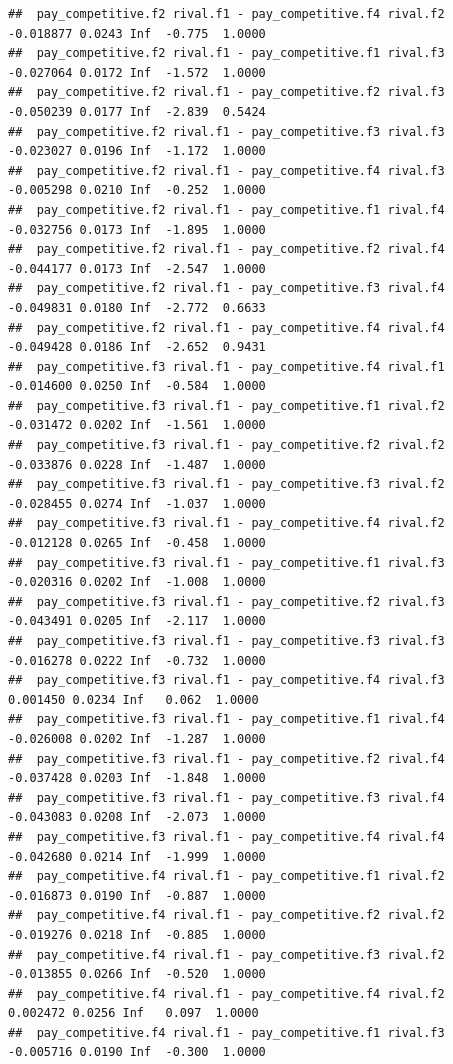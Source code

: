 \documentclass[
]{article}
\begin{document}
\begin{verbatim}
##  pay_competitive.f2 rival.f1 - pay_competitive.f4 rival.f2 -0.018877 0.0243 Inf  -0.775  1.0000
##  pay_competitive.f2 rival.f1 - pay_competitive.f1 rival.f3 -0.027064 0.0172 Inf  -1.572  1.0000
##  pay_competitive.f2 rival.f1 - pay_competitive.f2 rival.f3 -0.050239 0.0177 Inf  -2.839  0.5424
##  pay_competitive.f2 rival.f1 - pay_competitive.f3 rival.f3 -0.023027 0.0196 Inf  -1.172  1.0000
##  pay_competitive.f2 rival.f1 - pay_competitive.f4 rival.f3 -0.005298 0.0210 Inf  -0.252  1.0000
##  pay_competitive.f2 rival.f1 - pay_competitive.f1 rival.f4 -0.032756 0.0173 Inf  -1.895  1.0000
##  pay_competitive.f2 rival.f1 - pay_competitive.f2 rival.f4 -0.044177 0.0173 Inf  -2.547  1.0000
##  pay_competitive.f2 rival.f1 - pay_competitive.f3 rival.f4 -0.049831 0.0180 Inf  -2.772  0.6633
##  pay_competitive.f2 rival.f1 - pay_competitive.f4 rival.f4 -0.049428 0.0186 Inf  -2.652  0.9431
##  pay_competitive.f3 rival.f1 - pay_competitive.f4 rival.f1 -0.014600 0.0250 Inf  -0.584  1.0000
##  pay_competitive.f3 rival.f1 - pay_competitive.f1 rival.f2 -0.031472 0.0202 Inf  -1.561  1.0000
##  pay_competitive.f3 rival.f1 - pay_competitive.f2 rival.f2 -0.033876 0.0228 Inf  -1.487  1.0000
##  pay_competitive.f3 rival.f1 - pay_competitive.f3 rival.f2 -0.028455 0.0274 Inf  -1.037  1.0000
##  pay_competitive.f3 rival.f1 - pay_competitive.f4 rival.f2 -0.012128 0.0265 Inf  -0.458  1.0000
##  pay_competitive.f3 rival.f1 - pay_competitive.f1 rival.f3 -0.020316 0.0202 Inf  -1.008  1.0000
##  pay_competitive.f3 rival.f1 - pay_competitive.f2 rival.f3 -0.043491 0.0205 Inf  -2.117  1.0000
##  pay_competitive.f3 rival.f1 - pay_competitive.f3 rival.f3 -0.016278 0.0222 Inf  -0.732  1.0000
##  pay_competitive.f3 rival.f1 - pay_competitive.f4 rival.f3  0.001450 0.0234 Inf   0.062  1.0000
##  pay_competitive.f3 rival.f1 - pay_competitive.f1 rival.f4 -0.026008 0.0202 Inf  -1.287  1.0000
##  pay_competitive.f3 rival.f1 - pay_competitive.f2 rival.f4 -0.037428 0.0203 Inf  -1.848  1.0000
##  pay_competitive.f3 rival.f1 - pay_competitive.f3 rival.f4 -0.043083 0.0208 Inf  -2.073  1.0000
##  pay_competitive.f3 rival.f1 - pay_competitive.f4 rival.f4 -0.042680 0.0214 Inf  -1.999  1.0000
##  pay_competitive.f4 rival.f1 - pay_competitive.f1 rival.f2 -0.016873 0.0190 Inf  -0.887  1.0000
##  pay_competitive.f4 rival.f1 - pay_competitive.f2 rival.f2 -0.019276 0.0218 Inf  -0.885  1.0000
##  pay_competitive.f4 rival.f1 - pay_competitive.f3 rival.f2 -0.013855 0.0266 Inf  -0.520  1.0000
##  pay_competitive.f4 rival.f1 - pay_competitive.f4 rival.f2  0.002472 0.0256 Inf   0.097  1.0000
##  pay_competitive.f4 rival.f1 - pay_competitive.f1 rival.f3 -0.005716 0.0190 Inf  -0.300  1.0000

\end{verbatim}
\end{document}
